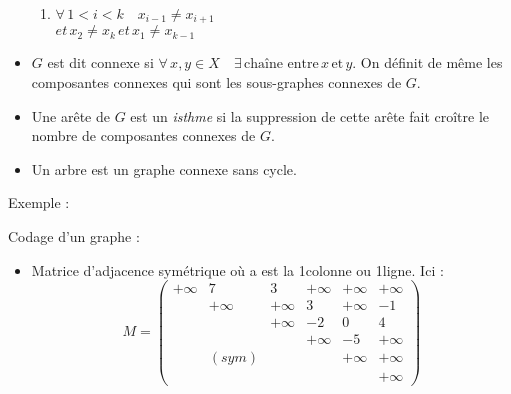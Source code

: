 \documentclass[a4paper, 8pt]{article}
\begin{document}
\begin{multicols*}{3}
\begin{itemize}
\begin{enumerate}
\item $\forall \, 1< i< k \quad x_{i-1} \neq x_{i+1}$ \\$ et\, x_2 \neq x_k \,et\, x_1 \neq x_{k-1}$
\end{enumerate}
\item $G$ est dit connexe si $\forall\,x,y\in X \quad \exists\,\text{chaîne entre}\,x\,\text{et}\,y$. On définit de même les composantes connexes qui sont les sous-graphes connexes de $G$.
\item Une arête de $G$ est un \textit{isthme} si la suppression de cette arête fait croître le nombre de composantes connexes de $G$.
\item Un arbre est un graphe connexe sans cycle.
\end{itemize}

Exemple :
\begin{center}
\end{center}

Codage d'un graphe :

\begin{itemize}
	\item Matrice d'adjacence symétrique où a est la 1\iere colonne ou 1\iere ligne. Ici : \\
	 \[M = \left(\begin{smallmatrix}
	+\infty & 7 & 3 & +\infty & +\infty & +\infty \\ 
	 & +\infty & +\infty & 3 & +\infty & -1 \\ 
	 &  & +\infty & -2 & 0 & 4 \\ 
	 &  &  & +\infty & -5 & +\infty \\ 
	 & (sym) &  &  & +\infty & +\infty \\ 
	 &  &  &  &  & +\infty
	\end{smallmatrix} \right)\]
	

\end{itemize}
\end{multicols*}
\end{document}
